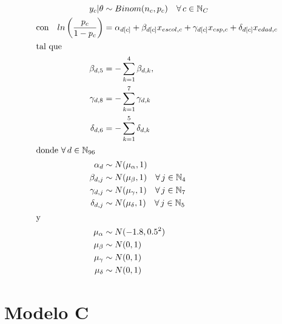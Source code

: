 \begin{align}\label{eq:Modelo_Comp_B}
y_c|\theta & \sim Binom(n_c,p_c) \quad \forall \, c \in \mathbb{N}_C \nonumber \\
\text{con} \quad ln\left(\dfrac{p_c}{1-p_c}\right) &= \alpha_{d[c]} + \beta_{d[c]} x_{escol,c} + \gamma_{d[c]} x_{csp,c} + \delta_{d[c]} x_{edad,c} \\ 
\intertext{tal que} 
\beta_{d,5} &= -\sum\limits_{k = 1}^{4} \beta_{d,k}, \nonumber \\
\gamma_{d,8} &= -\sum\limits_{k = 1}^{7} \gamma_{d,k} \nonumber \\
\delta_{d,6} &= -\sum\limits_{k = 1}^{5} \delta_{d,k} \nonumber \\
\intertext{donde $\forall \, d \in \mathbb{N}_{96}$}
\alpha_d & \sim N(\mu_{\alpha}, 1) \quad  \nonumber \\
\beta_{d,j} & \sim N(\mu_{\beta}, 1) \quad \forall \, j \in \mathbb{N}_{4} \nonumber \\
\gamma_{d,j} & \sim N(\mu_{\gamma}, 1) \quad \forall \, j \in \mathbb{N}_{7} \nonumber \\
\delta_{d,j} & \sim N(\mu_{\delta}, 1) \quad \forall \, j \in \mathbb{N}_{5} \nonumber \\
\intertext{y}
\mu_{\alpha} &\sim N(-1.8,0.5^2) \nonumber \\
\mu_{\beta} &\sim N(0,1) \nonumber \\
\mu_{\gamma} &\sim N(0,1) \nonumber \\
\mu_{\delta} &\sim N(0,1) \nonumber
\end{align}

\section*{Modelo C}

